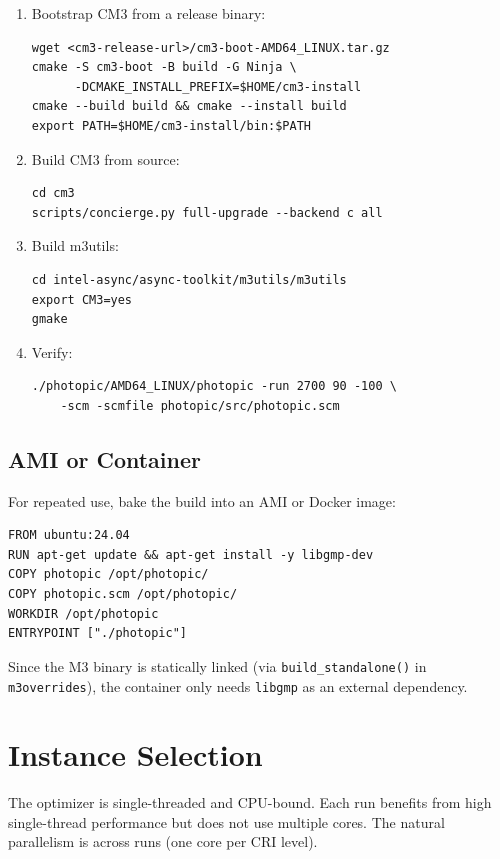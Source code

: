 \documentclass[11pt]{article}
\begin{document}
\begin{enumerate}
\item Bootstrap CM3 from a release binary:
\begin{lstlisting}
wget <cm3-release-url>/cm3-boot-AMD64_LINUX.tar.gz
cmake -S cm3-boot -B build -G Ninja \
      -DCMAKE_INSTALL_PREFIX=$HOME/cm3-install
cmake --build build && cmake --install build
export PATH=$HOME/cm3-install/bin:$PATH
\end{lstlisting}

\item Build CM3 from source:
\begin{lstlisting}
cd cm3
scripts/concierge.py full-upgrade --backend c all
\end{lstlisting}

\item Build m3utils:
\begin{lstlisting}
cd intel-async/async-toolkit/m3utils/m3utils
export CM3=yes
gmake
\end{lstlisting}

\item Verify:
\begin{lstlisting}
./photopic/AMD64_LINUX/photopic -run 2700 90 -100 \
    -scm -scmfile photopic/src/photopic.scm
\end{lstlisting}
\end{enumerate}

\subsection{AMI or Container}

For repeated use, bake the build into an AMI or Docker image:
\begin{lstlisting}
FROM ubuntu:24.04
RUN apt-get update && apt-get install -y libgmp-dev
COPY photopic /opt/photopic/
COPY photopic.scm /opt/photopic/
WORKDIR /opt/photopic
ENTRYPOINT ["./photopic"]
\end{lstlisting}

Since the M3 binary is statically linked (via \texttt{build\_standalone()}
in \texttt{m3overrides}), the container only needs \texttt{libgmp} as an
external dependency.

\section{Instance Selection}

The optimizer is single-threaded and CPU-bound.  Each run benefits from
high single-thread performance but does not use multiple cores.  The
natural parallelism is across runs (one core per CRI level).
\end{document}
